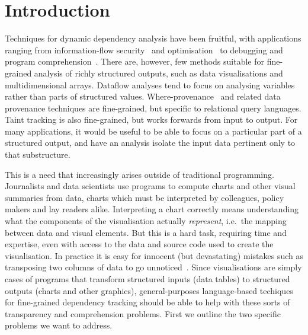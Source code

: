 \section{Introduction}
\label{sec:introduction}

Techniques for dynamic dependency analysis have been fruitful, with applications ranging from information-flow security~\cite{sabelfeld03} and optimisation~\cite{kildall73} to debugging and program comprehension~\cite{weiser81,delucia96}. There are, however, few methods suitable for fine-grained analysis of richly structured outputs, such as data visualisations and multidimensional arrays. Dataflow analyses \cite{reps95} tend to focus on analysing variables rather than parts of structured values. Where-provenance~\cite{buneman01} and related data provenance techniques are fine-grained, but specific to relational query languages. Taint tracking \cite{newsome05} is also fine-grained, but works forwards from input to output. For many applications, it would be useful to be able to focus on a particular part of a structured output, and have an analysis isolate the input data pertinent only to that substructure.

This is a need that increasingly arises outside of traditional programming. Journalists and data scientists use programs to compute charts and other visual summaries from data, charts which must be interpreted by colleagues, policy makers and lay readers alike. Interpreting a chart correctly means understanding what the components of the visualisation actually \emph{represent}, i.e.~the mapping between data and visual elements. But this is a hard task, requiring time and expertise, even with access to the data and source code used to create the visualisation. In practice it is easy for innocent (but devastating) mistakes such as transposing two columns of data to go unnoticed~\cite{miller06}. Since visualisations are simply cases of programs that transform structured inputs (data tables) to structured outputs (charts and other graphics), general-purposes language-based techiques for fine-grained dependency tracking should be able to help with these sorts of transparency and comprehension problems. First we outline the two specific problems we want to address.

